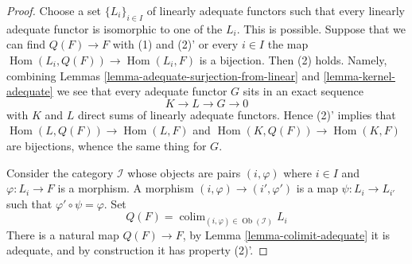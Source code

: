 \documentclass{stacks-project}
\theoremstyle{plain}
\theoremstyle{definition}
\theoremstyle{remark}
\numberwithin{equation}{subsection}
\def\colim{\mathop{\mathrm{colim}}\nolimits}
\def\Hom{\mathop{\mathrm{Hom}}\nolimits}
\def\Ob{\mathop{\mathrm{Ob}}\nolimits}
\begin{document}
\begin{proof}
Choose a set $\{L_i\}_{i \in I}$ of linearly adequate functors such that
every linearly adequate functor is isomorphic to one of the $L_i$.
This is possible. Suppose that we can find $Q(F) \to F$ with (1) and
(2)' or every $i \in I$ the map $\Hom(L_i, Q(F)) \to \Hom(L_i, F)$
is a bijection. Then (2) holds. Namely, combining
Lemmas \ref{lemma-adequate-surjection-from-linear} and
\ref{lemma-kernel-adequate}
we see that every adequate functor $G$ sits in an exact sequence
$$
K \to L \to G \to 0
$$
with $K$ and $L$ direct sums of linearly adequate functors. Hence (2)'
implies that
$\Hom(L, Q(F)) \to \Hom(L, F)$
and
$\Hom(K, Q(F)) \to \Hom(K, F)$
are bijections, whence the same thing for $G$.

\medskip\noindent
Consider the category $\mathcal{I}$ whose objects are pairs
$(i, \varphi)$ where $i \in I$ and $\varphi : L_i \to F$ is a morphism.
A morphism $(i, \varphi) \to (i', \varphi')$ is a map
$\psi : L_i \to L_{i'}$ such that $\varphi' \circ \psi = \varphi$.
Set
$$
Q(F) = \colim_{(i, \varphi) \in \Ob(\mathcal{I})} L_i
$$
There is a natural map $Q(F) \to F$, by
Lemma \ref{lemma-colimit-adequate}
it is adequate, and by construction it has property (2)'.
\end{proof}
\end{document}
